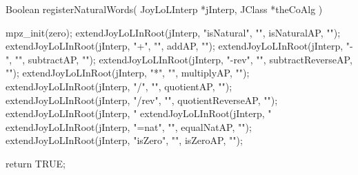 \startCCode
Boolean registerNaturalWords(
  JoyLoLInterp *jInterp,
  JClass       *theCoAlg
) {
  mpz_init(zero);
  extendJoyLoLInRoot(jInterp, "isNatural", "", isNaturalAP,        "");
  extendJoyLoLInRoot(jInterp, "+",         "", addAP,              "");
  extendJoyLoLInRoot(jInterp, "-",         "", subtractAP,         "");
  extendJoyLoLInRoot(jInterp, "-rev",      "", subtractReverseAP,  "");
  extendJoyLoLInRoot(jInterp, "*",         "", multiplyAP,         "");
  extendJoyLoLInRoot(jInterp, "/",         "", quotientAP,         "");
  extendJoyLoLInRoot(jInterp, "/rev",      "", quotientReverseAP,  "");
  extendJoyLoLInRoot(jInterp, "%
  extendJoyLoLInRoot(jInterp, "%
  extendJoyLoLInRoot(jInterp, "=nat",      "", equalNatAP,         "");
  extendJoyLoLInRoot(jInterp, "isZero",    "", isZeroAP,           "");
  
  return TRUE;
}
\stopCCode
